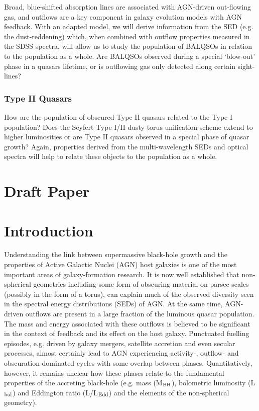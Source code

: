 Broad, blue-shifted absorption lines are associated with AGN-driven out-flowing gas, and outflows are a key component in galaxy evolution models with AGN feedback. With an adapted model, we will derive information from the SED (e.g. the dust-reddening) which, when combined with outflow properties measured in the SDSS spectra, will allow us to study the population of BALQSOs in relation to the population as a whole. Are BALQSOs observed during a special `blow-out' phase in a quasars lifetime, or is outflowing gas only detected along certain sight-lines? 

\subsubsection{Type II Quasars}

How are the population of obscured Type II quasars related to the Type I population? Does the Seyfert Type I/II dusty-torus unification scheme extend to higher luminosities or are Type II quasars observed in a special phase of quasar growth? Again, properties derived from the multi-wavelength SEDs and optical spectra will help to relate these objects to the population as a whole. 


\section{Draft Paper}

\section{Introduction}

Understanding the link between supermassive black-hole growth and the properties of Active Galactic Nuclei (AGN) host galaxies is one of the most important areas of galaxy-formation research. It is now well established that non-spherical geometries including some form of obscuring material on parsec scales (possibly in the form of a torus), can explain much of the observed diversity seen in the spectral energy distributions (SEDs) of AGN. At the same time, AGN-driven outflows are present in a large fraction of the luminous quasar population. The mass and energy associated with these outflows is believed to be significant in the context of feedback and its effect on the host galaxy. Punctuated fuelling episodes, e.g. driven by galaxy mergers, satellite accretion and even secular processes, almost certainly lead to AGN experiencing activity-, outflow- and obscuration-dominated cycles with some overlap between phases. Quantitatively, however, it remains unclear how these phases relate to the fundamental properties of the accreting black-hole (e.g.  mass (M$_{\rm{BH}}$), bolometric luminosity (L$_{\rm{bol}}$) and Eddington ratio (L/L$_{\rm{Edd}}$) and the elements of the non-spherical geometry). 

